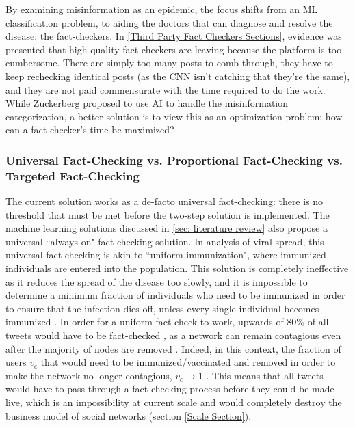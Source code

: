 \documentclass[preprint,review,12pt]{elsarticle}
\begin{document}
 By examining misinformation as an epidemic, the focus shifts from an ML classification problem, to aiding the doctors that can diagnose and resolve the disease: the fact-checkers. In \ref{Third Party Fact Checkers Sections}, evidence was presented that high quality fact-checkers are leaving because the platform is too cumbersome. There are simply too many posts to comb through, they have to keep rechecking identical posts (as the CNN isn't catching that they're the same), and they are not paid commensurate with the time required to do the work. While Zuckerberg proposed to use AI to handle the misinformation categorization, a better solution is to view this as an optimization problem: how can a fact checker's time be maximized? 
 
 \subsubsection{Universal Fact-Checking vs. Proportional Fact-Checking vs. Targeted Fact-Checking}
 The current solution works as a de-facto universal fact-checking: there is no threshold that must be met before the two-step solution is implemented. The machine learning solutions discussed in \ref{sec: literature review} also propose a universal ``always on" fact checking solution. In analysis of viral spread, this universal fact checking is akin to ``uniform immunization", where immunized individuals are entered into the population. This solution is completely ineffective as it reduces the spread of the disease too slowly, and it is impossible to determine a minimum fraction of individuals who need to be immunized in order to ensure that the infection dies off, unless every single individual becomes immunized \cite{pastor2002epidemic,pastor2002immunization,anderson1992infectious}. In order for a uniform fact-check to work, upwards of 80\% of all tweets would have to be fact-checked \cite{may1984spatial,hethcote2014gonorrhea,hethcote2013modeling,hethcote1987epidemiological,albert2000error, pastor2001epidemic}, as a network can remain contagious even after the majority of nodes are removed \cite{cohen2000resilience}. Indeed, in this context, the fraction of users $v_c$ that would need to be immunized/vaccinated and removed in order to make the network no longer contagious, $v_c \rightarrow 1$ \cite{cohen2003efficient,strogatz2001exploring,albert2002statistical,dorogovtsev2002evolution,pastor2002immunization}.
 This means that all tweets would have to pass through a fact-checking process before they could be made live, which is an impossibility at current scale and would completely destroy the business model of social networks (section \ref{Scale Section}).
 
\end{document}
